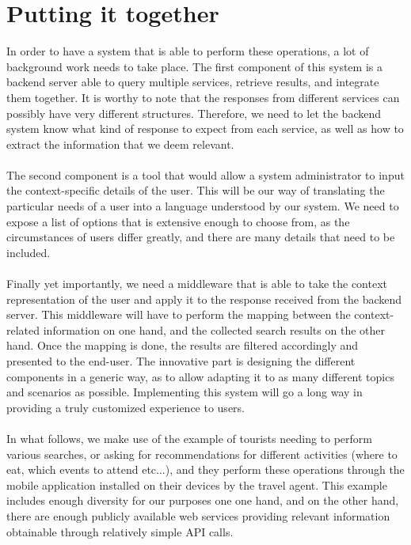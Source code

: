 \section{Putting it together}
\label{sec:together}
In order to have a system that is able to perform these operations, a lot of background work needs to take place. The first component of this system is a backend server able to query multiple services, retrieve results, and integrate them together. It is worthy to note that the responses from different services can possibly have very different structures. Therefore, we need to let the backend system know what kind of response to expect from each service, as well as how to extract the information that we deem relevant.\\\\
The second component is a tool that would allow a system administrator to input the context-specific details of the user. This will be our way of translating the particular needs of a user into a language understood by our system. We need to expose a list of options that is extensive enough to choose from, as the circumstances of users differ greatly, and there are many details that need to be included.\\\\
Finally yet importantly, we need a middleware that is able to take the context representation of the user and apply it to the response received from the backend server. This middleware will have to perform the mapping between the context-related information on one hand, and the collected search results on the other hand. Once the mapping is done, the results are filtered accordingly and presented to the end-user. The innovative part is designing the different components in a generic way, as to allow adapting it to as many different topics and scenarios as possible. Implementing this system will go a long way in providing a truly customized experience to users.\\\\
In what follows, we make use of the example of tourists needing to perform various searches, or asking for recommendations for different activities (where to eat, which events to attend etc...), and they perform these operations through the mobile application installed on their devices by the travel agent. This example includes enough diversity for our purposes one one hand, and on the other hand, there are enough publicly available web services providing relevant information obtainable through relatively simple API calls.
